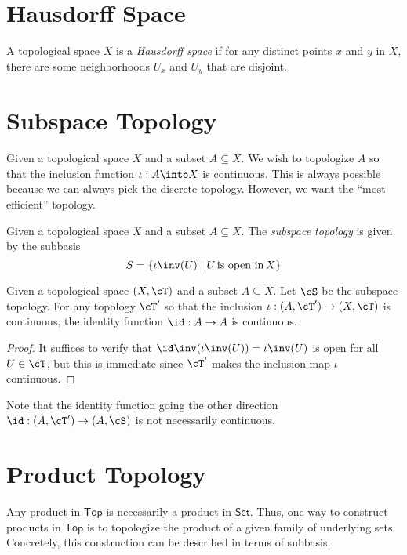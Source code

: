 \documentclass{amsart}
\begin{document}
\section{Hausdorff Space}
\label{sec:hausdorff-space}

\begin{defn}
  A topological space $X$ is a \emph{Hausdorff space} if for any distinct points $x$ and $y$ in $X$, there are some neighborhoods $U_{x}$ and $U_{y}$ that are disjoint.
\end{defn}

\section{Subspace Topology}
\label{sec:subspace-topology}

Given a topological space $X$ and a subset $A \subseteq X$.
We wish to topologize $A$ so that the inclusion function $\iota : A \into X$ is continuous.
This is always possible because we can always pick the discrete topology.
However, we want the ``most efficient'' topology.

\begin{defn}
  Given a topological space $X$ and a subset $A \subseteq X$.
  The \emph{subspace topology} is given by the subbasis
  \[
    S = \{\iota\inv(U) \mid U\,\text{is open in}\,X\}
  \]
\end{defn}

\begin{lem}
  Given a topological space $(X, \cT)$ and a subset $A \subseteq X$.
  Let $\cS$ be the subspace topology.
  For any topology $\cT'$ so that the inclusion $\iota : (A, \cT') \to (X, \cT)$ is continuous, the identity function $\id : A \to A$ is continuous.
  
\end{lem}
\begin{proof}
  It suffices to verify that $\id\inv(\iota\inv(U)) = \iota\inv(U)$ is open for all $U \in \cT$, but this is immediate since $\cT'$ makes the inclusion map $\iota$ continuous.
\end{proof}
Note that the identity function going the other direction $\id : (A, \cT') \to (A, \cS)$ is not necessarily continuous.

\section{Product Topology}
\label{sec:product-topology}

Any product in $\mathsf{Top}$ is necessarily a product in $\mathsf{Set}$.
Thus, one way to construct products in $\mathsf{Top}$ is to topologize the product of a given family of underlying sets.
Concretely, this construction can be described in terms of subbasis.
\end{document}
